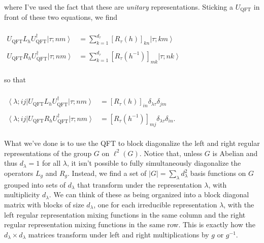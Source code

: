 \documentclass[]{article}
\begin{document}
\\
where I've used the fact that these are \textit{unitary} representations. Sticking a $U_\text{QFT}$ in front of these two equations, we find\\
\\
$\begin{aligned}
U_\text{QFT}L_hU_\text{QFT}^\dagger\left\vert\tau;nm\right\rangle&=\sum_{k=1}^{d_\tau}\left[R_\tau(h)\right]_{kn}\left\vert\tau;km\right\rangle\\
\\
U_\text{QFT}R_hU_\text{QFT}^\dagger\left\vert\tau;nm\right\rangle&=\sum_{k=1}^{d_\tau}\left[R_\tau(h^{-1})\right]_{mk}\left\vert\tau;nk\right\rangle
\end{aligned}$\\
\\
so that\\
\\
$\boxed{\begin{aligned}
\left\langle\lambda;ij\right\vert U_\text{QFT}L_hU_\text{QFT}^\dagger\left\vert\tau;nm\right\rangle&=\left[R_\tau(h)\right]_{in}\delta_{\lambda\tau}\delta_{jm}\\
\\
\left\langle\lambda;ij\right\vert U_\text{QFT}R_hU_\text{QFT}^\dagger\left\vert\tau;nm\right\rangle&=\left[R_\tau(h^{-1})\right]_{mj}\delta_{\lambda\tau}\delta_{in}.
\end{aligned}}$\\
\\
What we've done is to use the QFT to block diagonalize the left and right regular representations of the group $G$ on $\ell^2(G)$. Notice that, unless $G$ is Abelian and thus $d_\lambda =1$ for all $\lambda$, it isn't possible to fully simultaneously diagonalize the operators $L_g$ and $R_g$. Instead, we find a set of $\left\vert G\right\vert=\sum_{\lambda}d_\lambda^2$ basis functions on $G$ grouped into sets of $d_\lambda$ that transform under the representation $\lambda$, with multiplicity $d_\lambda$. We can think of these as being organized into a block diagonal matrix with blocks of size $d_\lambda$, one for each irreducible representation $\lambda$, with the left regular representation mixing functions in the same column and the right regular representation mixing functions in the same row. This is exactly how the $d_\lambda\times d_\lambda$ matrices transform under left and right multiplications by $g$ or $g^{-1}$.\\
\\
\end{document}
